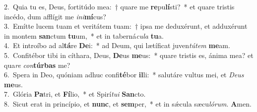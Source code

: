 {2.~}Quia tu es, Deus, fortitúdo mea:~† quare me \textbf{re}pu\textbf{lí}sti?~* et quare tristis incédo, dum afflígit me \textit{i}\textit{ni}\textbf{mí}cus?\\
{3.~}Emítte lucem tuam et veritátem tuam:~† ipsa me deduxérunt, et adduxérunt in montem \textbf{san}ctum \textbf{tu}um,~* et in taberná\textit{cu}\textit{la} \textbf{tu}a.\\
{4.~}Et introíbo ad al\textbf{tá}re \textbf{De}i:~* ad Deum, qui lætíficat juven\textit{tú}\textit{tem} \textbf{me}am.\\
{5.~}Confitébor tibi in cíthara, Deus, \textbf{De}us \textbf{me}us:~* quare tristis es, ánima mea? et qua\textit{re} \textit{con}\textbf{túr}\textbf{bas} me?\\
{6.~}Spera in Deo, quóniam adhuc confi\textbf{té}bor \textbf{il}li:~* salutáre vultus mei, et \textit{De}\textit{us} \textbf{me}us.\\
{7.~}Glória \textbf{Pa}tri, et \textbf{Fí}lio,~* et Spirí\textit{tu}\textit{i} \textbf{San}cto.\\
{8.~}Sicut erat in princípio, et \textbf{nunc}, et \textbf{sem}per,~* et in sǽcula sæcu\textit{ló}\textit{rum}. \textbf{A}men.\\
